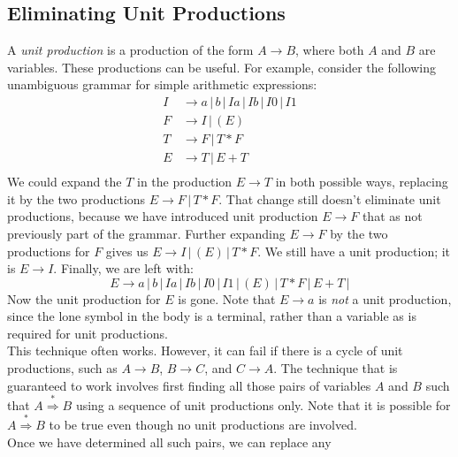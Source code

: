 \documentclass[]{article}
\begin{document}
    \subsection*{Eliminating Unit Productions}
      A \emph{unit production} is a production of the form $A \rightarrow B$,
      where both $A$ and $B$ are variables. These productions can be useful. For
      example, consider the following unambiguous grammar for simple arithmetic
      expressions:
        \begin{align*}
          I &\rightarrow a \, | \, b     \, | \, Ia \, | \, Ib \, | \, I0 \, |
          \, I1 \\
          F &\rightarrow I \, | \, ( E ) \\
          T &\rightarrow F \, | \, T * F \\
          E &\rightarrow T \, | \, E + T \\
        \end{align*}
      We could expand the $T$ in the production $E \rightarrow T$ in both
      possible ways, replacing it by the two productions $E \rightarrow F \, |
      \, T * F$. That change still doesn't eliminate unit productions, because
      we have introduced unit production $E \rightarrow F$ that as not
      previously part of the grammar. Further expanding $E \rightarrow F$ by the
      two productions for $F$ gives us $E \rightarrow I \, | \, ( E ) \, | \,
      T * F$. We still have a unit production; it is $E \rightarrow I$. Finally,
      we are left with:
        \[
          E \rightarrow a \, | \, b \, | \, Ia \, | \, Ib \, | \, I0 \, | \, I1
          \, | \, ( E ) \, | \, T * F \, | \, E + T \, |
        \]
      Now the unit production for $E$ is gone. Note that $E \rightarrow a$ is
      \emph{not} a unit production, since the lone symbol in the body is a
      terminal, rather than a variable as is required for unit productions. \\
      \indent This technique often works. However, it can fail if there is a
      cycle of unit productions, such as $A \rightarrow B$, $B \rightarrow C$,
      and $C \rightarrow A$. The technique that is guaranteed to work involves
      first finding all those pairs of variables $A$ and $B$ such that
      $A \overset{*}{\Rightarrow} B$ using a sequence of unit productions only.
      Note that it is possible for $A \overset{*}{\Rightarrow} B$ to be true
      even though no unit productions are involved. \\
      \indent Once we have determined all such pairs, we can replace any
\end{document}
